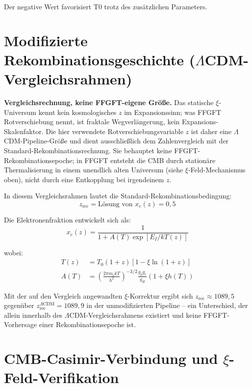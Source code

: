 	Der negative Wert favorisiert T0 trotz des zusätzlichen Parameters.
	
	\section{Modifizierte Rekombinationsgeschichte (\texorpdfstring{$\Lambda$CDM}{LambdaCDM}-Vergleichsrahmen)}

	\begin{important}
	\textbf{Vergleichsrechnung, keine FFGFT-eigene Größe.} Das statische
	$\xi$-Universum kennt kein kosmologisches $z$ im Expansionssinn; was FFGFT
	Rotverschiebung nennt, ist fraktale Wegverlängerung, kein
	Expansions-Skalenfaktor. Die hier verwendete Rotverschiebungsvariable $z$
	ist daher eine $\Lambda$CDM-Pipeline-Größe und dient ausschließlich dem
	Zahlenvergleich mit der Standard-Rekombinationsrechnung. Sie behauptet keine
	FFGFT-Rekombinationsepoche; in FFGFT entsteht die CMB durch stationäre
	Thermalisierung in einem unendlich alten Universum (siehe $\xi$-Feld-Mechanismus
	oben), nicht durch eine Entkopplung bei irgendeinem $z$.
	\end{important}

	In diesem Vergleichsrahmen lautet die Standard-Rekombinationsbedingung:
	\begin{equation}
		z_{\text{rec}} = \text{Lösung von } x_e(z) = 0,5
	\end{equation}

	Die Elektronenfraktion entwickelt sich als:
	\begin{equation}
		x_e(z) = \frac{1}{1 + A(T) \exp[E_I/kT(z)]}
	\end{equation}

	wobei:
	\begin{align}
		T(z) &= T_0(1+z)[1 - \xi\ln(1+z)] \\
		A(T) &= \left(\frac{2\pi m_e kT}{h^2}\right)^{-3/2} 
		\frac{g_p g_e}{g_H} (1 + \xi h(T))
	\end{align}

	Mit der auf den Vergleich angewandten $\xi$-Korrektur ergibt sich
	$z_{\text{rec}} \approx 1089,5$ gegenüber
	$z_{\text{rec}}^{\Lambda\text{CDM}} = 1089,9$ in der unmodifizierten Pipeline
	-- ein Unterschied, der allein innerhalb des $\Lambda$CDM-Vergleichsrahmens
	existiert und keine FFGFT-Vorhersage einer Rekombinationsepoche ist.

	
	\section{CMB-Casimir-Verbindung und $\xi$-Feld-Verifikation}
	\label{sec:cmb_casimir}
	
